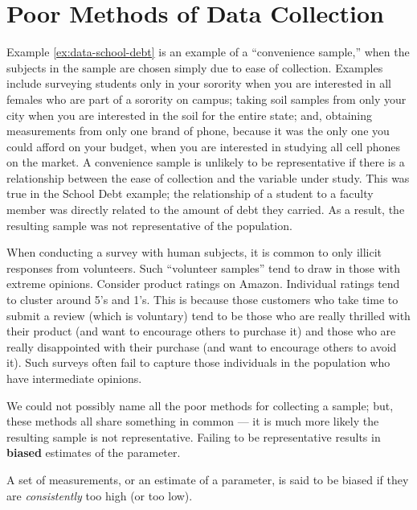 \documentclass[]{book}
\theoremstyle{definition}
\theoremstyle{definition}
\theoremstyle{remark}
\let\BeginKnitrBlock\begin \let\EndKnitrBlock\end
\begin{document}
\section{Poor Methods of Data
Collection}\label{poor-methods-of-data-collection}

Example \ref{ex:data-school-debt} is an example of a ``convenience
sample,'' when the subjects in the sample are chosen simply due to ease
of collection. Examples include surveying students only in your sorority
when you are interested in all females who are part of a sorority on
campus; taking soil samples from only your city when you are interested
in the soil for the entire state; and, obtaining measurements from only
one brand of phone, because it was the only one you could afford on your
budget, when you are interested in studying all cell phones on the
market. A convenience sample is unlikely to be representative if there
is a relationship between the ease of collection and the variable under
study. This was true in the School Debt example; the relationship of a
student to a faculty member was directly related to the amount of debt
they carried. As a result, the resulting sample was not representative
of the population.

When conducting a survey with human subjects, it is common to only
illicit responses from volunteers. Such ``volunteer samples'' tend to
draw in those with extreme opinions. Consider product ratings on Amazon.
Individual ratings tend to cluster around 5's and 1's. This is because
those customers who take time to submit a review (which is voluntary)
tend to be those who are really thrilled with their product (and want to
encourage others to purchase it) and those who are really disappointed
with their purchase (and want to encourage others to avoid it). Such
surveys often fail to capture those individuals in the population who
have intermediate opinions.

We could not possibly name all the poor methods for collecting a sample;
but, these methods all share something in common --- it is much more
likely the resulting sample is not representative. Failing to be
representative results in \textbf{biased} estimates of the parameter.

\BeginKnitrBlock{definition}[Bias]
\protect\hypertarget{def:defn-bias}{}{\label{def:defn-bias} {} }A set of measurements, or an estimate of a parameter, is said to
be biased if they are \emph{consistently} too high (or too low).
\EndKnitrBlock{definition}
\end{document}
